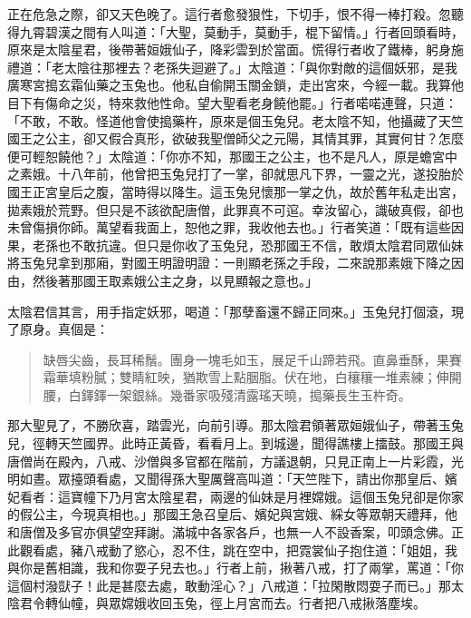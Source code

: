 正在危急之際，卻又天色晚了。這行者愈發狠性，下切手，恨不得一棒打殺。忽聽得九霄碧漢之間有人叫道：「大聖，莫動手，莫動手，棍下留情。」行者回頭看時，原來是太陰星君，後帶著姮娥仙子，降彩雲到於當面。慌得行者收了鐵棒，躬身施禮道：「老太陰往那裡去？老孫失迴避了。」太陰道：「與你對敵的這個妖邪，是我廣寒宮搗玄霜仙藥之玉兔也。他私自偷開玉關金鎖，走出宮來，今經一載。我算他目下有傷命之災，特來救他性命。望大聖看老身饒他罷。」行者喏喏連聲，只道：「不敢，不敢。怪道他會使搗藥杵，原來是個玉兔兒。老太陰不知，他攝藏了天竺國王之公主，卻又假合真形，欲破我聖僧師父之元陽，其情其罪，其實何甘？怎麼便可輕恕饒他？」太陰道：「你亦不知，那國王之公主，也不是凡人，原是蟾宮中之素娥。十八年前，他曾把玉兔兒打了一掌，卻就思凡下界，一靈之光，遂投胎於國王正宮皇后之腹，當時得以降生。這玉兔兒懷那一掌之仇，故於舊年私走出宮，拋素娥於荒野。但只是不該欲配唐僧，此罪真不可逭。幸汝留心，識破真假，卻也未曾傷損你師。萬望看我面上，恕他之罪，我收他去也。」行者笑道：「既有這些因果，老孫也不敢抗違。但只是你收了玉兔兒，恐那國王不信，敢煩太陰君同眾仙妹將玉兔兒拿到那廂，對國王明證明證：一則顯老孫之手段，二來說那素娥下降之因由，然後著那國王取素娥公主之身，以見顯報之意也。」

太陰君信其言，用手指定妖邪，喝道：「那孽畜還不歸正同來。」玉兔兒打個滾，現了原身。真個是：
\begin{quote}
缺唇尖齒，長耳稀鬚。團身一塊毛如玉，展足千山蹄若飛。直鼻垂酥，果賽霜華填粉膩；雙睛紅映，猶欺雪上點胭脂。伏在地，白穰穰一堆素練；伸開腰，白鐸鐸一架銀絲。幾番家吸殘清露瑤天曉，搗藥長生玉杵奇。
\end{quote}

那大聖見了，不勝欣喜，踏雲光，向前引導。那太陰君領著眾姮娥仙子，帶著玉兔兒，徑轉天竺國界。此時正黃昏，看看月上。到城邊，聞得譙樓上擂鼓。那國王與唐僧尚在殿內，八戒、沙僧與多官都在階前，方議退朝，只見正南上一片彩霞，光明如晝。眾擡頭看處，又聞得孫大聖厲聲高叫道：「天竺陛下，請出你那皇后、嬪妃看者：這寶幢下乃月宮太陰星君，兩邊的仙妹是月裡嫦娥。這個玉兔兒卻是你家的假公主，今現真相也。」那國王急召皇后、嬪妃與宮娥、綵女等眾朝天禮拜，他和唐僧及多官亦俱望空拜謝。滿城中各家各戶，也無一人不設香案，叩頭念佛。正此觀看處，豬八戒動了慾心，忍不住，跳在空中，把霓裳仙子抱住道：「姐姐，我與你是舊相識，我和你耍子兒去也。」行者上前，揪著八戒，打了兩掌，罵道：「你這個村潑獃子！此是甚麼去處，敢動淫心？」八戒道：「拉閑散悶耍子而已。」那太陰君令轉仙幢，與眾嫦娥收回玉兔，徑上月宮而去。行者把八戒揪落塵埃。

